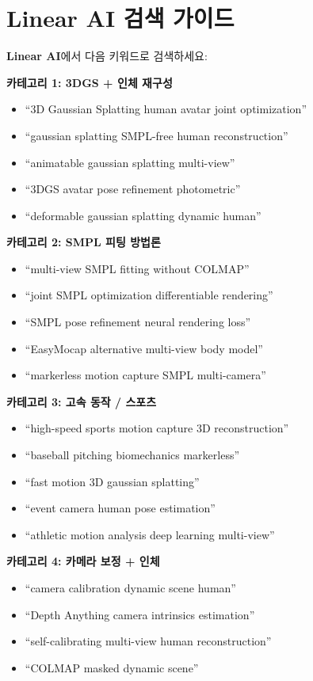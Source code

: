 \documentclass[11pt, a4paper]{report}
\begin{document}
\chapter{Linear AI 검색 가이드}

\begin{searchbox}
\textbf{Linear AI}에서 다음 키워드로 검색하세요:

\textbf{카테고리 1: 3DGS + 인체 재구성}
\begin{itemize}[nosep]
  \item ``3D Gaussian Splatting human avatar joint optimization''
  \item ``gaussian splatting SMPL-free human reconstruction''
  \item ``animatable gaussian splatting multi-view''
  \item ``3DGS avatar pose refinement photometric''
  \item ``deformable gaussian splatting dynamic human''
\end{itemize}

\textbf{카테고리 2: SMPL 피팅 방법론}
\begin{itemize}[nosep]
  \item ``multi-view SMPL fitting without COLMAP''
  \item ``joint SMPL optimization differentiable rendering''
  \item ``SMPL pose refinement neural rendering loss''
  \item ``EasyMocap alternative multi-view body model''
  \item ``markerless motion capture SMPL multi-camera''
\end{itemize}

\textbf{카테고리 3: 고속 동작 / 스포츠}
\begin{itemize}[nosep]
  \item ``high-speed sports motion capture 3D reconstruction''
  \item ``baseball pitching biomechanics markerless''
  \item ``fast motion 3D gaussian splatting''
  \item ``event camera human pose estimation''
  \item ``athletic motion analysis deep learning multi-view''
\end{itemize}

\textbf{카테고리 4: 카메라 보정 + 인체}
\begin{itemize}[nosep]
  \item ``camera calibration dynamic scene human''
  \item ``Depth Anything camera intrinsics estimation''
  \item ``self-calibrating multi-view human reconstruction''
  \item ``COLMAP masked dynamic scene''
\end{itemize}


\end{searchbox}
\end{document}
